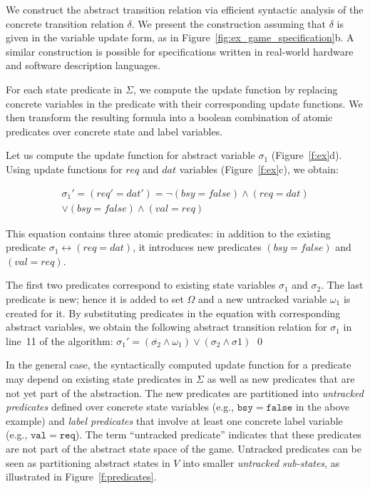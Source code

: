 We construct the abstract transition relation via efficient syntactic analysis of the concrete transition relation $\delta$. We present the construction assuming that $\delta$ is given in the variable update form, as in Figure~\ref{fig:ex_game_specification}b. A similar construction is possible for specifications written in real-world hardware and software description languages.

For each state predicate in $\Sigma$, we compute the update function by replacing concrete variables in the predicate with their corresponding update functions. We then transform the resulting formula into a boolean combination of atomic predicates over concrete state and label variables.

\begin{ex}
    Let us compute the update function for abstract variable $\sigma_1$ (Figure~\ref{f:ex}d).  Using update functions for $req$ and $dat$ variables (Figure~\ref{f:ex}c), we obtain: 
    
    \begin{multline}
    \sigma_1' = (req' = dat') = \neg(bsy = false) \land (req=dat) \\ \lor (bsy=false) \land (val=req)
    \end{multline}
    
    \noindent This equation contains three atomic predicates: in addition to the existing predicate $\sigma_1 \leftrightarrow (req=dat)$, it introduces new predicates $(bsy=false)$ and $(val=req)$.  

    The first two predicates correspond to existing state variables $\sigma_1$ and $\sigma_2$.  The last predicate is new; hence it is added to set $\Omega$ and a new untracked variable $\omega_1$ is created for it.  By substituting predicates in the equation with corresponding abstract variables, we obtain the following abstract transition relation for $\sigma_1$ in line~11 of the algorithm:
    $\sigma_1' = (\overline{\sigma_2} \land \omega_1) \lor (\sigma_2 \land \sigma1)$
    \qed
\end{ex}

In the general case, the syntactically computed update function for a predicate may depend on existing state predicates in $\Sigma$ as well as new predicates that are not yet part of the abstraction.  The new predicates are partitioned into \emph{untracked predicates} defined over concrete state variables (e.g., $\mathtt{bsy=false}$ in the above example) and \emph{label predicates} that involve at least one concrete label variable (e.g., $\mathtt{val=req}$).  The term ``untracked predicate'' indicates that these predicates are not part of the abstract state space of the game.  Untracked predicates can be seen as partitioning abstract states in $V$ into smaller \emph{untracked sub-states}, as illustrated in Figure~\ref{f:predicates}.

